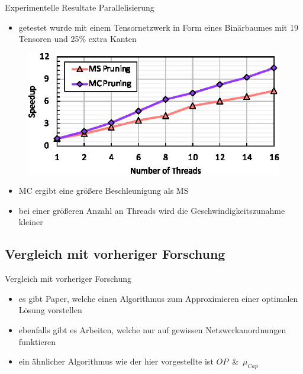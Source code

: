 \documentclass{beamer}
\begin{document}
\begin{frame}{Experimentelle Resultate Parallelisierung}
	\begin{itemize}
		\item getestet wurde mit einem Tensornetzwerk in Form eines Binärbaumes mit 19 Tensoren und 25\% extra Kanten
	\end{itemize}
	\begin{figure}
		\includegraphics{figure_13}
	\end{figure} \pause
	\begin{itemize}
		\item MC ergibt eine größere Beschleunigung als MS
		\item bei einer größeren Anzahl an Threads wird die Geschwindigkeitszunahme kleiner
	\end{itemize}
\end{frame}

\subsection{Vergleich mit vorheriger Forschung}

\begin{frame}{Vergleich mit vorheriger Forschung}
	\begin{itemize}
		\item es gibt Paper, welche einen Algorithmus zum Approximieren einer optimalen Lösung vorstellen
		\item ebenfalls gibt es Arbeiten, welche nur auf gewissen Netzwerkanordnungen funktieren
		\item ein ähnlicher Algorithmus wie der hier vorgestellte ist \mbox{$OP$ \& $\mu_{Cap}$}\cite{op_mu_cap}
	\end{itemize}
\end{frame}
\end{document}
